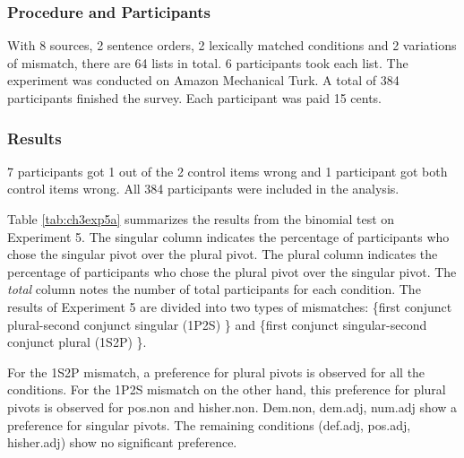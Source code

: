 \documentclass[
  11pt          %
  ,letterpaper  %
  ,center       %
  ,noupper      %
  ]{uconnthesis2}
\begin{document}
\subsubsection{Procedure and Participants}

With 8 sources, 2 sentence orders, 2 lexically matched conditions and 2 variations of mismatch, there are 64 lists in total. 6 participants took each list. The experiment was conducted on Amazon Mechanical Turk. A total of 384 participants finished the survey. Each participant was paid 15 cents. 

\vspace{1cm}
\subsubsection{Results}

7 participants got 1 out of the 2 control items wrong and 1 participant got both control items wrong. All 384 participants were included in the analysis.

Table \ref{tab:ch3exp5a} summarizes the results from the binomial test on Experiment 5. The singular column indicates the percentage of participants who chose the singular pivot over the plural pivot. The plural column indicates the percentage of participants who chose the plural pivot over the singular pivot. The \textit{total} column notes the number of total participants for each condition. The results of Experiment 5 are divided into two types of mismatches: \{first conjunct plural-second conjunct singular (1P2S) \} and \{first conjunct singular-second conjunct plural (1S2P) \}.

For the 1S2P mismatch, a preference for plural pivots is observed for all the conditions. For the 1P2S mismatch on the other hand, this preference for plural pivots is observed for pos.non and hisher.non. Dem.non, dem.adj, num.adj show a preference for singular pivots. The remaining conditions (def.adj, pos.adj, hisher.adj) show no significant preference. 
\end{document}
